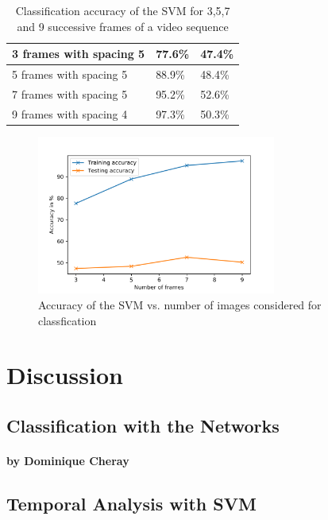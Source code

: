 \documentclass[11pt]{report}
\begin{document}
\begin{table}[]
\centering
\begin{tabular}{|l|l|l|}
\hline
3 frames with spacing 5 & 77.6\% & 47.4\% \\ \hline
5 frames with spacing 5 & 88.9\% & 48.4\% \\ \hline
7 frames with spacing 5 & 95.2\% & 52.6\% \\ \hline
9 frames with spacing 4 & 97.3\% & 50.3\% \\ \hline
\end{tabular}
\caption{Classification accuracy of the SVM for 3,5,7 and 9 successive frames of a video sequence}
\label{result_table_SMV}
\end{table}

\begin{figure}
  \centering
  \includegraphics[width=0.7\textwidth]{AccuracySVM.png}
  \caption{Accuracy of the SVM vs. number of images considered for classfication}
  \label{result_fig_svm}
\end{figure}


\chapter{Discussion}
\section{Classification with the Networks}
\subsubsection{by Dominique Cheray}

\section{Temporal Analysis with SVM}
\end{document}
